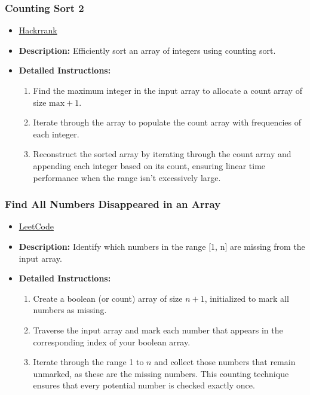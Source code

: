 \subsubsection{Counting Sort 2}
\begin{itemize}
    \item \href{https://www.hackerrank.com/challenges/countingsort2/problem}{Hackrrank}
    \item \textbf{Description:} Efficiently sort an array of integers using counting sort.
    \item \textbf{Detailed Instructions:}
    \begin{enumerate}
        \item Find the maximum integer in the input array to allocate a count array of size \(\text{max}+1\).
        \item Iterate through the array to populate the count array with frequencies of each integer.
        \item Reconstruct the sorted array by iterating through the count array and appending each integer based on its count, ensuring linear time performance when the range isn’t excessively large.
    \end{enumerate}
\end{itemize}

\subsubsection{Find All Numbers Disappeared in an Array}
\begin{itemize}
    \item \href{https://leetcode.com/problems/find-all-numbers-disappeared-in-an-array/}{LeetCode}
    \item \textbf{Description:} Identify which numbers in the range [1, n] are missing from the input array.
    \item \textbf{Detailed Instructions:}
    \begin{enumerate}
        \item Create a boolean (or count) array of size \(n+1\), initialized to mark all numbers as missing.
        \item Traverse the input array and mark each number that appears in the corresponding index of your boolean array.
        \item Iterate through the range 1 to \(n\) and collect those numbers that remain unmarked, as these are the missing numbers. This counting technique ensures that every potential number is checked exactly once.
    \end{enumerate}
\end{itemize}